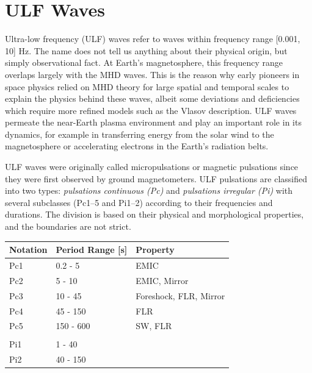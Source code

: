 \documentclass[
  notoc %
]{tufte-book}
\begin{document}
\hypertarget{ulf-waves}{%
\section{ULF Waves}\label{ulf-waves}}

Ultra-low frequency (ULF) waves refer to waves within frequency range
{[}0.001, 10{]} Hz. The name does not tell us anything about their
physical origin, but simply observational fact. At Earth's
magnetosphere, this frequency range overlaps largely with the MHD waves.
This is the reason why early pioneers in space physics relied on MHD
theory for large spatial and temporal scales to explain the physics
behind these waves, albeit some deviations and deficiencies which
require more refined models such as the Vlasov description. ULF waves
permeate the near-Earth plasma environment and play an important role in
its dynamics, for example in transferring energy from the solar wind to
the magnetosphere or accelerating electrons in the Earth's radiation
belts.

ULF waves were originally called micropulsations or magnetic pulsations
since they were first observed by ground magnetometers. ULF pulsations
are classified into two types: \emph{pulsations continuous (Pc)} and
\emph{pulsations irregular (Pi)} with several subclasses (Pc1--5 and
Pi1--2) according to their frequencies and durations. The division is
based on their physical and morphological properties, and the boundaries
are not strict.

\begin{longtable}[]{@{}lll@{}}
\toprule
Notation & Period Range {[}s{]} & Property \\
\midrule
\endhead
Pc1 & 0.2 - 5 & EMIC \\
Pc2 & 5 - 10 & EMIC, Mirror \\
Pc3 & 10 - 45 & Foreshock, FLR, Mirror \\
Pc4 & 45 - 150 & FLR \\
Pc5 & 150 - 600 & SW, FLR \\
& & \\
Pi1 & 1 - 40 & \\
Pi2 & 40 - 150 & \\
\bottomrule
\end{longtable}
\end{document}
